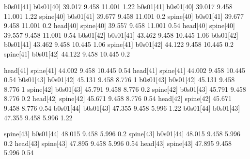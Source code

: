b0s01[41]    b0s01[40]    39.017    9.458    11.001    1.22
b0s01[41]    b0s01[40]    39.017    9.458    11.001    1.22
spine[40]    b0s01[41]    39.677    9.458    11.001    0.2
spine[40]    b0s01[41]    39.677    9.458    11.001    0.2
head[40]    spine[40]    39.557    9.458    11.001    0.54
head[40]    spine[40]    39.557    9.458    11.001    0.54
b0s01[42]    b0s01[41]    43.462    9.458    10.445    1.06
b0s01[42]    b0s01[41]    43.462    9.458    10.445    1.06
spine[41]    b0s01[42]    44.122    9.458    10.445    0.2
spine[41]    b0s01[42]    44.122    9.458    10.445    0.2


head[41]    spine[41]    44.002    9.458    10.445    0.54
head[41]    spine[41]    44.002    9.458    10.445    0.54
b0s01[43]    b0s01[42]    45.131    9.458    8.776    1
b0s01[43]    b0s01[42]    45.131    9.458    8.776    1
spine[42]    b0s01[43]    45.791    9.458    8.776    0.2
spine[42]    b0s01[43]    45.791    9.458    8.776    0.2
head[42]    spine[42]    45.671    9.458    8.776    0.54
head[42]    spine[42]    45.671    9.458    8.776    0.54
b0s01[44]    b0s01[43]    47.355    9.458    5.996    1.22
b0s01[44]    b0s01[43]    47.355    9.458    5.996    1.22


spine[43]    b0s01[44]    48.015    9.458    5.996    0.2
spine[43]    b0s01[44]    48.015    9.458    5.996    0.2
head[43]    spine[43]    47.895    9.458    5.996    0.54
head[43]    spine[43]    47.895    9.458    5.996    0.54
